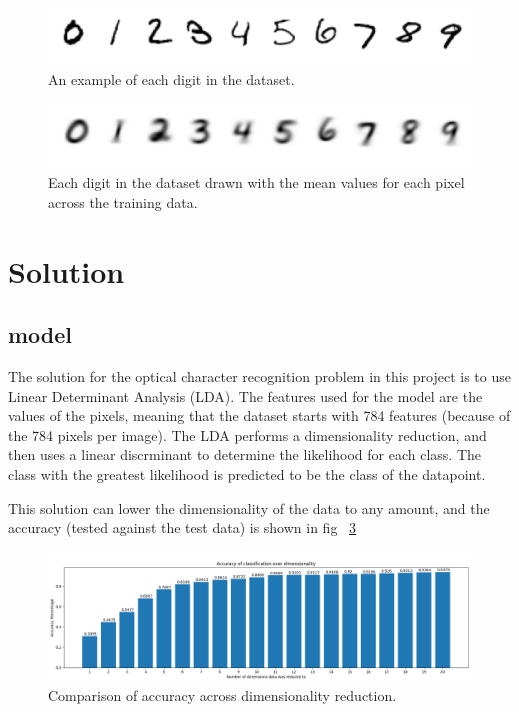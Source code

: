 \documentclass[12pt, twocolumn]{article}
\begin{document}
\begin{figure}
    \centering
    \includegraphics[width=\columnwidth]{images/exampleClasses.png}
    \caption{An example of each digit in the dataset.%
      \label{fig:exampleClasses}}
\end{figure}

\begin{figure}
    \centering
    \includegraphics[width=\columnwidth]{images/classMeans.png}
    \caption{Each digit in the dataset drawn with the mean values for each pixel across the training data. %
      \label{fig:classMeans}}
\end{figure}



\section{Solution}
\subsection{model}
The solution for the optical character recognition problem in this project is to use Linear Determinant Analysis (LDA). The features used for the model are the values of the pixels, meaning that the dataset starts with 784 features (because of the 784 pixels per image). The LDA performs a dimensionality reduction, and then uses a linear discrminant to determine the likelihood for each class. The class with the greatest likelihood is predicted to be the class of the datapoint. 

This solution can lower the dimensionality of the data to any amount, and the accuracy (tested against the test data) is shown in fig ~\ref{fig:DimensionBars}


\begin{figure}
    \centering
    \includegraphics[width=\textwidth]{images/CPUBars.png}
    \caption{Comparison of accuracy across dimensionality reduction. %
      \label{fig:DimensionBars}}
\end{figure}
\end{document}
